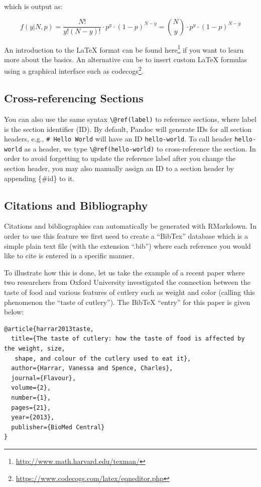 \documentclass[12pt,]{krantz}
\renewcommand{\href}[2]{#2\footnote{\url{#1}}}
\begin{document}
which is output as:

\[f(y|N,p) = \frac{N!}{y!(N-y)!}\cdot p^y \cdot (1-p)^{N-y} = {{N}\choose{y}} \cdot p^y \cdot (1-p)^{N-y}\]

An introduction to the LaTeX format can be found
\href{http://www.math.harvard.edu/texman/}{here} if you want to learn
more about the basics. An alternative can be to insert custom LaTeX
formulas using a graphical interface such as
\href{https://www.codecogs.com/latex/eqneditor.php}{codecogs}.

\subsection{Cross-referencing
Sections}\label{cross-referencing-sections}

You can also use the same syntax \texttt{\textbackslash{}@ref(label)} to
reference sections, where label is the section identifier (ID). By
default, Pandoc will generate IDs for all section headers, e.g.,
\texttt{\#\ Hello\ World} will have an ID \texttt{hello-world}. To call
header \texttt{hello-world} as a header, we type
\texttt{\textbackslash{}@ref(hello-world)} to cross-reference the
section. In order to avoid forgetting to update the reference label
after you change the section header, you may also manually assign an ID
to a section header by appending \{\#id\} to it.

\subsection{Citations and
Bibliography}\label{citations-and-bibliography}

Citations and bibliographies can automatically be generated with
RMarkdown. In order to use this feature we first need to create a
``BibTex'' database which is a simple plain text file (with the
extension ``.bib'') where each reference you would like to cite is
entered in a specific manner.

To illustrate how this is done, let us take the example of a recent
paper where two researchers from Oxford University investigated the
connection between the taste of food and various features of cutlery
such as weight and color (calling this phenomenon the ``taste of
cutlery''). The BibTeX ``entry'' for this paper is given below:

\begin{verbatim}
@article{harrar2013taste,
  title={The taste of cutlery: how the taste of food is affected by the weight, size,
   shape, and colour of the cutlery used to eat it},
  author={Harrar, Vanessa and Spence, Charles},
  journal={Flavour},
  volume={2},
  number={1},
  pages={21},
  year={2013},
  publisher={BioMed Central}
}
\end{verbatim}
\end{document}
